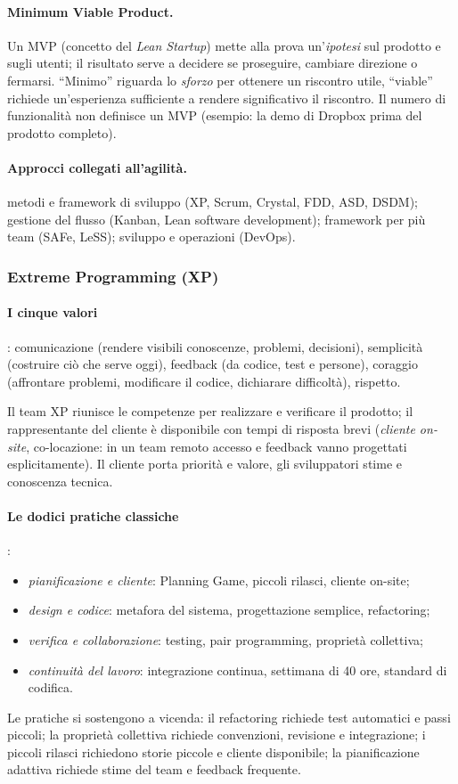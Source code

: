 \documentclass[a4paper,12pt]{article}
\begin{document}
\paragraph{Minimum Viable Product.} Un MVP (concetto del \emph{Lean Startup}) mette alla
prova un'\emph{ipotesi} sul prodotto e sugli utenti; il risultato serve a decidere se
proseguire, cambiare direzione o fermarsi. ``Minimo'' riguarda lo \emph{sforzo} per ottenere un
riscontro utile, ``viable'' richiede un'esperienza sufficiente a rendere significativo il
riscontro. Il numero di funzionalità non definisce un MVP (esempio: la demo di Dropbox
prima del prodotto completo).

\paragraph{Approcci collegati all'agilità.}
metodi e framework di sviluppo (XP, Scrum, Crystal, FDD, ASD, DSDM); gestione del flusso
(Kanban, Lean software development); framework per più team (SAFe, LeSS); sviluppo e
operazioni (DevOps).

\subsubsection{Extreme Programming (XP)}
\paragraph{I cinque valori}: comunicazione (rendere visibili conoscenze, problemi,
decisioni), semplicità (costruire ciò che serve oggi), feedback (da codice, test e
persone), coraggio (affrontare problemi, modificare il codice, dichiarare difficoltà),
rispetto.

Il team XP riunisce le competenze per realizzare e verificare il prodotto; il
rappresentante del cliente è disponibile con tempi di risposta brevi (\emph{cliente
on-site}, co-locazione: in un team remoto accesso e feedback vanno progettati
esplicitamente). Il cliente porta priorità e valore, gli sviluppatori stime e conoscenza
tecnica.

\paragraph{Le dodici pratiche classiche}:
\begin{itemize}
  \item \emph{pianificazione e cliente}: Planning Game, piccoli rilasci, cliente on-site;
  \item \emph{design e codice}: metafora del sistema, progettazione semplice, refactoring;
  \item \emph{verifica e collaborazione}: testing, pair programming, proprietà collettiva;
  \item \emph{continuità del lavoro}: integrazione continua, settimana di 40 ore, standard
        di codifica.
\end{itemize}
Le pratiche si sostengono a vicenda: il refactoring richiede test automatici e passi
piccoli; la proprietà collettiva richiede convenzioni, revisione e integrazione; i piccoli
rilasci richiedono storie piccole e cliente disponibile; la pianificazione adattiva
richiede stime del team e feedback frequente.
\end{document}
